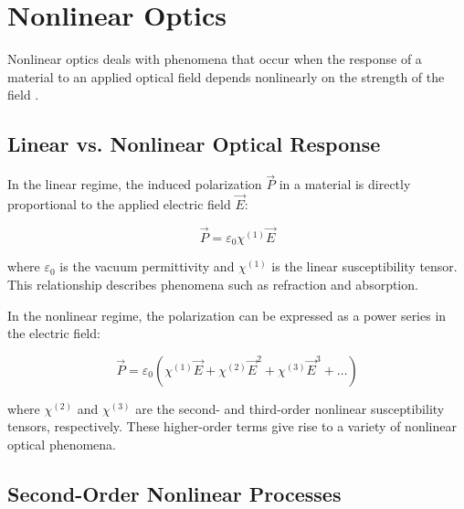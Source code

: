 \section{Nonlinear Optics}
\label{sec:nonlinear_optics}

\noindent 
Nonlinear optics deals with phenomena that occur when the response of a material to an applied optical field depends nonlinearly on the strength of the field \cite{boyd2008contents}.

\subsection{Linear vs. Nonlinear Optical Response}
\label{subsec:linear_vs_nonlinear}

\noindent 
In the linear regime, the induced polarization $\vec{P}$ in a material is directly proportional to the applied electric field $\vec{E}$:

\begin{equation}
	\vec{P} = \varepsilon_0 \chi^{(1)} \vec{E}
	\label{eq:linear_polarization}
\end{equation}

\noindent 
where $\varepsilon_0$ is the vacuum permittivity and $\chi^{(1)}$ is the linear susceptibility tensor. This relationship describes phenomena such as refraction and absorption.

\noindent 
In the nonlinear regime, the polarization can be expressed as a power series in the electric field:

\begin{equation}
	\vec{P} = \varepsilon_0 (\chi^{(1)} \vec{E} + \chi^{(2)} \vec{E}^2 + \chi^{(3)} \vec{E}^3 + \ldots)
	\label{eq:nonlinear_polarization}
\end{equation}

\noindent 
where $\chi^{(2)}$ and $\chi^{(3)}$ are the second- and third-order nonlinear susceptibility tensors, respectively. These higher-order terms give rise to a variety of nonlinear optical phenomena.


\subsection{Second-Order Nonlinear Processes}
\label{subsec:second_order}

